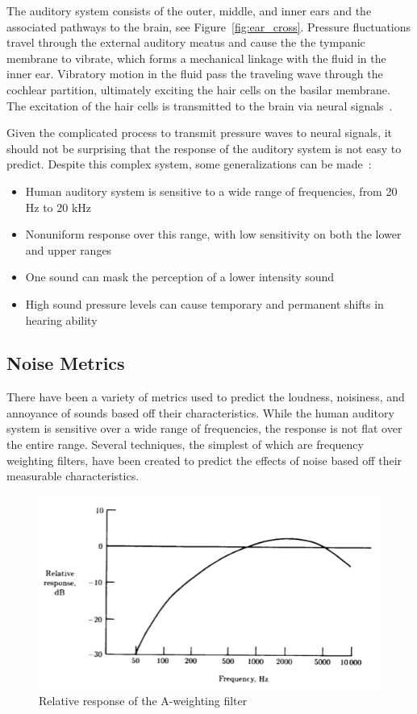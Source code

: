 \documentclass[]{aiaa-tc}%
\begin{document}
The auditory system consists of the outer, middle, and inner ears and the associated pathways to the brain, see Figure~\ref{fig:ear_cross}. Pressure fluctuations travel through the external auditory meatus and cause the the tympanic membrane to vibrate, which forms a mechanical linkage with the fluid in the inner ear. Vibratory motion in the fluid pass the traveling wave through the cochlear partition, ultimately exciting the hair cells on the basilar membrane. The excitation of the hair cells is transmitted to the brain via neural signals~\cite{powell1991human}.

Given the complicated process to transmit pressure waves to neural signals, it should not be surprising that the response of the auditory system is not easy to predict. Despite this complex system, some generalizations can be made~\cite{powell1991human}:
\begin{itemize}
\item Human auditory system is sensitive to a wide range of frequencies, from 20 Hz to 20 kHz
\item Nonuniform response over this range, with low sensitivity on both the lower and upper ranges
\item One sound can mask the perception of a lower intensity sound
\item High sound pressure levels can cause temporary and permanent shifts in hearing ability
\end{itemize}

\subsection{Noise Metrics}
There have been a variety of metrics used to predict the loudness, noisiness, and annoyance of sounds based off their characteristics. While the human auditory system is sensitive over a wide range of frequencies, the response is not flat over the entire range. Several techniques, the simplest of which are frequency weighting filters, have been created to predict the effects of noise based off their measurable characteristics.

\begin{figure}[tb!]
  \centering
  \includegraphics[width=\textwidth]{figs/sla.png}
  \caption{Relative response of the A-weighting filter~\cite{powell1991human}}
  \label{fig:sla}
\end{figure}
\end{document}
